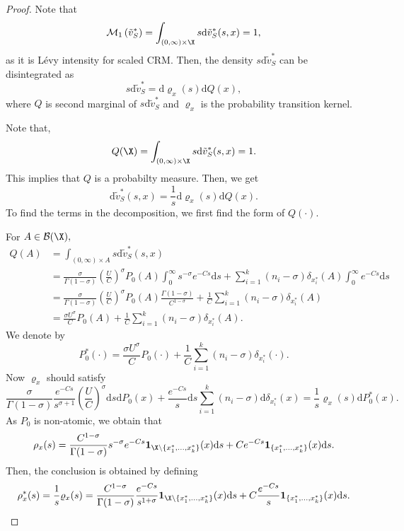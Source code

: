 \begin{proof}
Note that 
\[
\mathcal{M}_1\left(\tilde{v}^*_{S}\right) = \int_{(0, \infty)\times \X }s \mathrm{d}\tilde{v}^*_{S}(s,x) = 1,
\]
as it is L\'evy intensity for scaled CRM. Then, the density $s\mathrm{d}\tilde{v}^*_{S}$ can be disintegrated as 
\[
s\mathrm{d}\tilde{v}^*_{S} = \mathrm{d} \varrho_x(s)\mathrm{d}Q(x),
\]
where $Q$ is second marginal of $s\mathrm{d}\tilde{v}^*_{S}$ and $\varrho_x$ is the probability transition kernel.

Note that,
\[
Q(\X) = \int_{(0,\infty)\times \X}s\mathrm{d}\tilde{v}^*_{S}(s,x) = 1.
\]
This implies that $Q$ is a probabilty measure. Then, we get
\[
\mathrm{d}\tilde{v}^*_{S}(s,x) = \frac{1}{s}\mathrm{d}\varrho_x(s)\mathrm{d}Q(x).
\]
To find the terms in the decomposition, we first find the form of $Q(\cdot).$

For $A \in \mathcal{B}(\X),$
\begin{align*}
    Q(A) &= \int_{(0,\infty)\times A}s\mathrm{d}\tilde{v}^*_{S}(s,x) \\
    & = \frac{ \sigma}{\Gamma(1-\sigma)}\left( \frac{U}{C} \right)^\sigma P_0(A) \int_0^\infty s^{-\sigma}e^{-Cs}\mathrm{d}s 
    + \sum_{i = 1}^k (n_i - \sigma) \delta_{x_i^*}(A) \int_0^\infty e^{-Cs}\mathrm{d}s \\ 
    &= \frac{ \sigma}{\Gamma(1-\sigma)}\left( \frac{U}{C}\right)^\sigma P_0(A) \frac{\Gamma(1-\sigma)}{C^{1-\sigma}} 
    + \frac{1}{C} \sum_{i = 1}^k(n_i - \sigma)\delta_{x_i^*}(A) \\
    & = \frac{\sigma U^\sigma}{C} P_0(A) + \frac{1}{C}\sum_{i = 1}^k (n_i - \sigma) \delta_{x_i^*}(A).
\end{align*}
We denote by 
\[
P_0^*(\cdot) = \frac{\sigma U^\sigma}{C} P_0(\cdot) + \frac{1}{C}\sum_{i = 1}^k (n_i - \sigma) \delta_{x_i^*}(\cdot).
\]
Now $\varrho_x$ should satisfy
\[
\frac{ \sigma}{\Gamma(1-\sigma)}\frac{e^{-Cs}}{s^{\sigma+1}}\left( \frac{U}{C} \right)^\sigma\mathrm{d}s \mathrm{d}P_0(x) + 
\frac{e^{-Cs}}{s}\mathrm{d}s \sum_{i = 1}^k(n_i - \sigma) \mathrm{d}\delta_{x_i^*}(x) = \frac{1}{s}\varrho_x(s)\mathrm{d}P^*_0(x).
\]
As $P_0$ is non-atomic, we obtain that 
\[
\rho_x(s) = \frac{C^{1-\sigma}}{\Gamma(1-\sigma)}s^{-\sigma}e^{-Cs}\mathbf{1}_{\X \backslash\{x_1^*,\dots, x_k^*\}}(x)\mathrm{d}s + 
Ce^{-Cs}\mathbf{1}_{\{x_1^*,\dots, x_k^*\}}(x)\mathrm{d}s.
\]
Then, the conclusion is obtained by defining 
\[
\rho_x^*(s) = \frac{1}{s}\varrho_x(s) = \frac{C^{1-\sigma}}{\Gamma(1-\sigma)}\frac{e^{-Cs}}{s^{1+\sigma}}\mathbf{1}_{\X \backslash\{x_1^*,\dots, x_k^*\}}(x)\mathrm{d}s + C\frac{e^{-Cs}}{s}\mathbf{1}_{\{x_1^*,\dots, x_k^*\}}(x)\mathrm{d}s.
\]
\end{proof}


